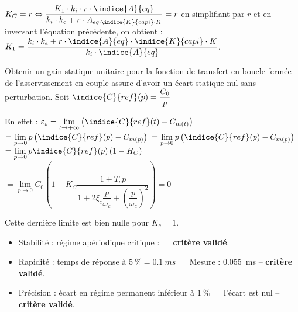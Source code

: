 \ifprof
\begin{corrige}
$
K_C=r \Leftrightarrow \dfrac{K_1\cdot k_i\cdot r\cdot \indice{A}{eq}}{k_i\cdot k_e+r\cdot A_{eq\cdot \indice{K}{capi}\cdot K}}=r
$ en simplifiant par $r$ et en inversant l'équation précédente, on obtient : 
$K_1=\dfrac{k_i\cdot k_e+r\cdot \indice{A}{eq}\cdot \indice{K}{capi}\cdot K}{k_i\cdot \indice{A}{eq}}$.

Obtenir un gain statique unitaire pour la fonction de transfert en boucle fermée de l'asservissement en couple assure d'avoir un écart statique nul sans perturbation.
Soit $\indice{C}{ref}(p)=\dfrac{C_0}{p}$

En effet : 
$
\varepsilon_s=\lim\limits_{t\rightarrow+\infty}  \left(\indice{C}{ref}(t)-C_{m(t)}\right)$
$=\lim\limits_{p\rightarrow 0} p \left(\indice{C}{ref}(p)-C_{m(p)}\right)$
$=\lim\limits_{p\rightarrow 0} p \left(\indice{C}{ref}(p)-C_{m(p)}\right)$
$=\lim\limits_{p\rightarrow 0} p \indice{C}{ref}(p) \left(1-H_C\right)$
$=\lim\limits_{p\rightarrow 0} C_{0} \left(1-K_C\dfrac{1+T_c p}{1+2\xi_c\dfrac{p}{\omega_c}+\left(\dfrac{p}{\omega_c}\right)^2}\right)=0$

Cette dernière limite est bien nulle pour $K_c=1$.

%
\end{corrige}\else\fi


\ifprof\begin{corrige}
\begin{itemize}
\item Stabilité : régime apériodique critique : $\quad$ \textbf{critère validé}.
\item Rapidité : temps de réponse à $\SI{5}{\%} =\SI{0,1}{ms}$ $\quad$ Mesure : \SI{0,055}{ms} --  \textbf{critère validé}.
\item Précision : écart en régime permanent inférieur à $\SI{1}{\%}$ $\quad$ l'écart est nul -- \textbf{critère validé}.
\end{itemize}
\end{corrige}\else\fi

